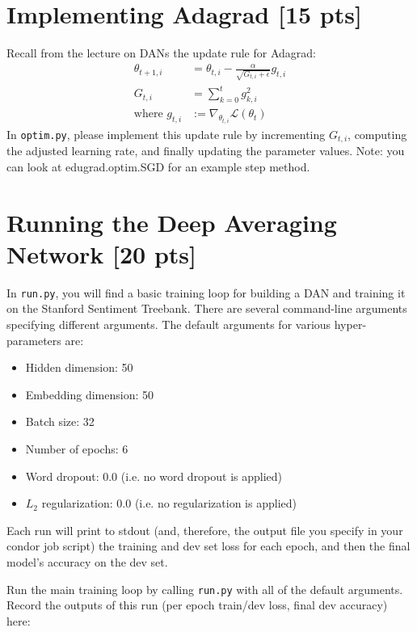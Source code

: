 \documentclass[11pt]{article}
\begin{document}
\section{Implementing Adagrad [15 pts]}

Recall from the lecture on DANs the update rule for Adagrad:
\begin{align*}
  \theta_{t+1, i} &= \theta_{t, i} - \frac{\alpha}{\sqrt{G_{t, i} + \epsilon}} g_{t, i}
  \\
  G_{t, i} &= \sum_{k=0}^t g_{k, i}^2
  \\
  \text{where } g_{t, i} &:= \nabla_{\theta_{t,i}} \mathcal{L}(\theta_t)
\end{align*}
In \texttt{optim.py}, please implement this update rule by incrementing $G_{t, i}$, computing the adjusted learning rate, and finally updating the parameter values.  Note: you can look at edugrad.optim.SGD for an example step method.


\section{Running the Deep Averaging Network [20 pts]}

In \texttt{run.py}, you will find a basic training loop for building a DAN and training it on the Stanford Sentiment Treebank.  There are several command-line arguments specifying different arguments.  The default arguments for various hyper-parameters are:
\begin{itemize}
  \item Hidden dimension: 50
  \item Embedding dimension: 50
  \item Batch size: 32
  \item Number of epochs: 6
  \item Word dropout: 0.0 (i.e. no word dropout is applied)
  \item $L_2$ regularization: 0.0 (i.e. no regularization is applied)
\end{itemize}
Each run will print to stdout (and, therefore, the output file you specify in your condor job script) the training and dev set loss for each epoch, and then the final model's accuracy on the dev set.

\vspace{2em}
 Run the main training loop by calling \texttt{run.py} with all of the default arguments.  Record the outputs of this run (per epoch train/dev loss, final dev accuracy) here: 
\end{document}
